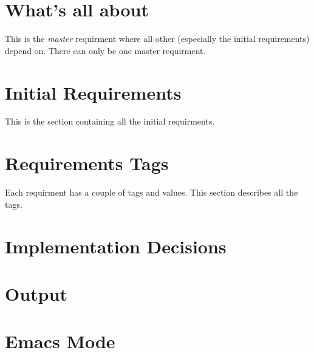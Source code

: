 \documentclass{article}
\begin{document}
\section{What's all about}
This is the \textsl{master} requirment where all other (especially the
initial requirements) depend on. There can only be one master requirment.


\section{Initial Requirements}
This is the section containing all the initial requirments.









\section{Requirements Tags}
Each requirment has a couple of tags and values.  This section
describes all the tags.













\section{Implementation Decisions}





\section{Output}






\section{Emacs Mode}






\end{document}

